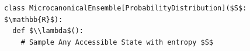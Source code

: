 \documentclass[border=10pt]{standalone}
\begin{document}
\begin{lstlisting}
class MicrocanonicalEnsemble[ProbabilityDistribution]($S$: $\mathbb{R}$):
  def $\\lambda$():
    # Sample Any Accessible State with entropy $S$
\end{lstlisting}
\end{document}
